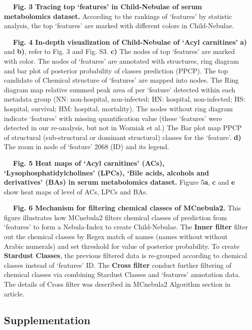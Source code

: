 \documentclass[
]{article}
\begin{document}
   \textbf{Fig. 3 \textbar{} Tracing top `features' in Child-Nebulae of
serum metabolomics dataset.} According to the rankings of `features' by
statistic analysis, the top `features' are marked with different colors
in Child-Nebulae.

   \textbf{Fig. 4 \textbar{} In-depth visualization of Child-Nebulae of
`Acyl carnitines'} \textbf{a)} and \textbf{b)}, refer to Fig. 3 and Fig.
S3. \textbf{c)} The nodes of top `features' are marked with color. The
nodes of `features' are annotated with structures, ring diagram and bar
plot of posterior probability of classes prediction (PPCP). The top
candidate of Chemical structure of `features' are mapped into nodes. The
Ring diagram map relative summed peak area of per `feature' detected
within each metadata group (NN: non-hospital, non-infected; HN:
hospital, non-infected; HS: hospital, survival; HM: hospital,
mortality). The nodes without ring diagram indicate `features' with
missing quantification value (these `features' were detected in our
re-analysis, but not in Wozniak et al.) The Bar plot map PPCP of
structural (sub-structural or dominant structural) classes for the
`feature'. \textbf{d)} The zoom in node of `feature' 2068 (ID) and its
legend.

   \textbf{Fig. 5 \textbar{} Heat maps of `Acyl carnitines' (ACs),
`Lysophosphatidylcholines' (LPCs), `Bile acids, alcohols and
derivatives' (BAs) in serum metabolomics dataset.} Figure 5\textbf{a},
\textbf{c} and \textbf{e} show heat maps of level of ACs, LPCs and BAs.

   \textbf{Fig. 6 \textbar{} Mechanism for filtering chemical classes of
MCnebula2.} This figure illustrates how MCnebula2 filters chemical
classes of prediction from `features' to form a Nebula-Index to create
Child-Nebulae. The \textbf{Inner filter} filter out the chemical classes
by Regex match of names (names without without Arabic numerals) and set
threshold for value of posterior probability. To create \textbf{Stardust
Classes}, the previous filtered data is re-grouped according to chemical
classes instead of `features' ID. The \textbf{Cross filter} conduct
further filtering of chemical classes via combining Stardust Classes and
`features' annotation data. The details of Cross filter was described in
MCnebula2 Algorithm section in article.

\hypertarget{supplementation}{%
\subsection{Supplementation}\label{supplementation}}
\end{document}
